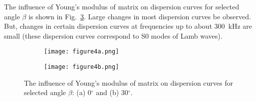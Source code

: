 \documentclass[preprint,12pt]{elsarticle}
\providecommand{\DIFaddbeginFL}{} %
\providecommand{\DIFaddendFL}{} %
\providecommand{\DIFdelbeginFL}{} %
\providecommand{\DIFdelendFL}{} %
\begin{document}
The influence of Young's modulus of matrix on dispersion curves for selected angle $\beta$ is shown in Fig.~\ref{fig:em}. Large changes in most dispersion curves be observed. But, changes in certain dispersion curves at frequencies up to about 300~kHz are small (these dispersion curves correspond to S0 modes of Lamb waves).

\begin{figure} [h!]
	\centering
	\begin{subfigure}[b]{0.49\textwidth}
		\centering
		\DIFdelbeginFL %
\DIFdelendFL \DIFaddbeginFL \texttt{[image: figure4a.png]}
		\DIFaddendFL \caption{}
		\label{fig:em0}
	\end{subfigure}
	\hfill
	\begin{subfigure}[b]{0.49\textwidth}
		\centering
		\DIFdelbeginFL %
\DIFdelendFL \DIFaddbeginFL \texttt{[image: figure4b.png]}
		\DIFaddendFL \caption{}
		\label{fig:em30}
	\end{subfigure}
	\caption{The influence of Young's modulus of matrix  on dispersion curves for selected angle $\beta$: (a) 0$^{\circ}$ and (b) 30$^{\circ}$.} 
	\label{fig:em}
\end{figure}
\end{document}
